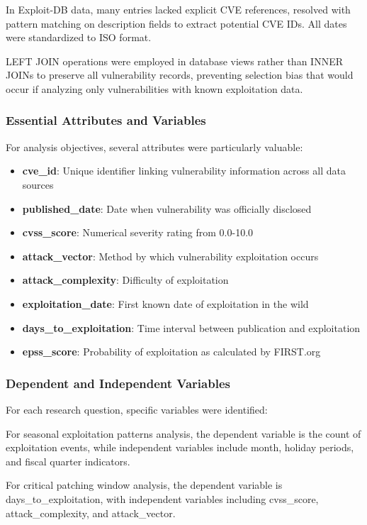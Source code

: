 \documentclass[runningheads]{llncs}
\begin{document}
In Exploit-DB data, many entries lacked explicit CVE references, resolved with pattern matching on description fields to extract potential CVE IDs. All dates were standardized to ISO format. 

LEFT JOIN operations were employed in database views rather than INNER JOINs to preserve all vulnerability records, preventing selection bias that would occur if analyzing only vulnerabilities with known exploitation data.

\subsubsection{Essential Attributes and Variables}
For analysis objectives, several attributes were particularly valuable:

\begin{itemize}
    \item \textbf{cve\_id}: Unique identifier linking vulnerability information across all data sources
    \item \textbf{published\_date}: Date when vulnerability was officially disclosed
    \item \textbf{cvss\_score}: Numerical severity rating from 0.0-10.0 \cite{cvss_framework}
    \item \textbf{attack\_vector}: Method by which vulnerability exploitation occurs
    \item \textbf{attack\_complexity}: Difficulty of exploitation
    \item \textbf{exploitation\_date}: First known date of exploitation in the wild
    \item \textbf{days\_to\_exploitation}: Time interval between publication and exploitation
    \item \textbf{epss\_score}: Probability of exploitation as calculated by FIRST.org \cite{jacobs2019exploit}
\end{itemize}

\subsubsection{Dependent and Independent Variables}
For each research question, specific variables were identified:

For seasonal exploitation patterns analysis, the dependent variable is the count of exploitation events, while independent variables include month, holiday periods, and fiscal quarter indicators.

For critical patching window analysis, the dependent variable is days\_to\_exploitation, with independent variables including cvss\_score, attack\_complexity, and attack\_vector.
\end{document}
